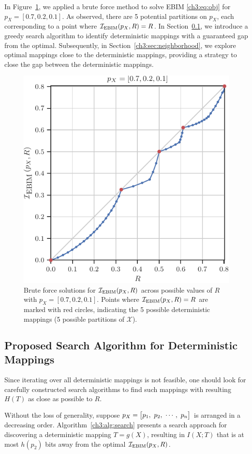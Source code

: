 In Figure~\ref{ch3:fig:bruteforce}, we applied a brute force method to solve EBIM \eqref{ch3:eq:obj} for $p_X=[0.7, 0.2, 0.1]$. As observed, there are 5 potential partitions on $p_X$, each corresponding to a point where $\mathcal{I}_\text{EBIM}(p_X, R) = R$. In Section~\ref{ch3:sec:prposedsearch}, we introduce a greedy search algorithm to identify deterministic mappings with a guaranteed gap from the optimal. Subsequently, in Section~\ref{ch3:sec:neighborhood}, we explore optimal mappings close to the deterministic mappings, providing a strategy to close the gap between the deterministic mappings.

\begin{figure}[h!]
    \centering
    \includegraphics[width=.55\linewidth]{figs/ch3/numerical1.pdf}
    \caption{
        Brute force solutions for $\mathcal{I}_\text{EBIM}(p_X, R)$ across possible values of $R$ with $p_X = [0.7, 0.2, 0.1]$. Points where $\mathcal{I}_\text{EBIM}(p_X, R) = R$ are marked with red circles, indicating the 5 possible deterministic mappings (5 possible partitions of $\mathcal{X}$).
    }
    \label{ch3:fig:bruteforce}
\end{figure}
\FloatBarrier

\subsection{Proposed Search Algorithm for Deterministic Mappings}\label{ch3:sec:prposedsearch}
Since iterating over all deterministic mappings is not feasible, one should look for carefully constructed search algorithms to find such mappings with resulting $H(T)$ as close as possible to $R$. 

Without the loss of generality, suppose $p_X = \rvect{p_1, \ p_2, \ \cdots, \ p_n}$ is arranged in a decreasing order. 
Algorithm~\ref{ch3:alg:search} presents a search approach for discovering a deterministic mapping $ T=g(X) $, resulting in $I(X;T)$ that is at most $h(p_2)$ bits away from the optimal $ \mathcal{I}_\text{EBIM}(p_X, R) $.

